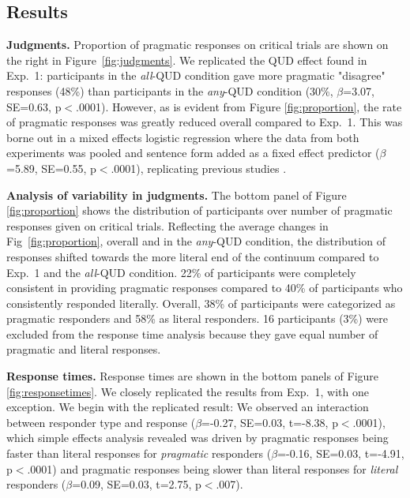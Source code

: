 \documentclass[10pt,letterpaper]{article}
\newcommand{\figref}[1]{Figure \ref{#1}}
\begin{document}
\subsection{Results}

\noindent \textbf{Judgments.} Proportion of pragmatic responses on critical trials are shown on the right in Figure~\ref{fig:judgments}. We replicated the QUD effect found in Exp.~1: participants in the \textit{all}-QUD condition gave more pragmatic "disagree" responses (48\%) than participants in the \textit{any}-QUD condition (30\%, $\beta$=3.07, SE=0.63, p$<$.0001). However, as is evident from \figref{fig:proportion}, the rate of pragmatic responses was greatly reduced overall compared to Exp.~1. This was borne out in a mixed effects logistic regression where the data from both experiments was  pooled and sentence form added as a fixed effect predictor ($\beta$=5.89, SE=0.55, p$<$.0001), replicating previous studies \cite{DegenTanenhaus2015,Degen2015}. 


\noindent \textbf{Analysis of variability in judgments.} The bottom panel of \figref{fig:proportion} shows the distribution of participants over number of pragmatic responses given on critical trials. Reflecting the average changes in  Fig~\ref{fig:proportion}, overall and in the \emph{any}-QUD condition, the distribution of  responses shifted towards the more literal end of the continuum compared to Exp.~1 and the \emph{all}-QUD condition.  22\% of participants were completely consistent in providing pragmatic responses compared to 40\% of participants who consistently responded literally. Overall, 38\% of participants were categorized as pragmatic responders and 58\% as literal responders. 16 participants (3\%) were excluded from the response time analysis because they gave equal number of pragmatic and literal responses.

\noindent \textbf{Response times.} Response times are shown in the bottom panels of \figref{fig:responsetimes}. We closely replicated the results from Exp.~1, with one exception. We begin with the replicated result: We observed an interaction between responder type and response ($\beta$=-0.27, SE=0.03, t=-8.38, p$<$.0001), which simple effects analysis revealed was driven by pragmatic responses being faster than literal responses for \emph{pragmatic}  responders ($\beta$=-0.16, SE=0.03, t=-4.91, p$<$.0001) and pragmatic responses being slower than literal responses for \emph{literal} responders ($\beta$=0.09, SE=0.03, t=2.75, p$<$.007). 
\end{document}
